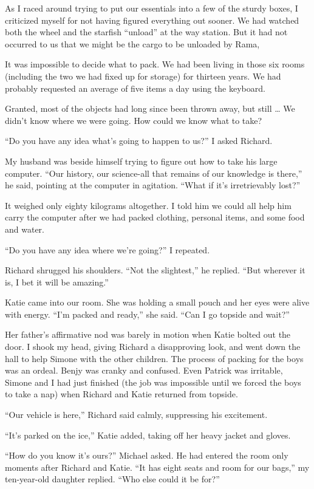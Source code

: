 \documentclass[]{article}
\begin{document}
{As I raced around trying to put our essentials into a few of the sturdy boxes, I criticized myself for not having figured everything out sooner.  We had watched both the wheel and the starfish “unload” at the way station.  But it had not occurred to us that we might be the cargo to be unloaded by Rama,

It was impossible to decide what to pack.  We had been living in those six rooms (including the two we had fixed up for storage) for thirteen years.  We had probably requested an average of five items a day using the keyboard.

Granted, most of the objects had long since been thrown away, but still … We didn’t know where we were going.  How could we know what to take?

“Do you have any idea what’s going to happen to us?” I asked Richard.

My husband was beside himself trying to figure out how to take his large computer.  “Our history, our science-all that remains of our knowledge is there,” he said, pointing at the computer in agitation.  “What if it’s irretrievably lost?”

It weighed only eighty kilograms altogether.  I told him we could all help him carry the computer after we had packed clothing, personal items, and some food and water.

“Do you have any idea where we’re going?” I repeated.

Richard shrugged his shoulders.  “Not the slightest,” he replied.  “But wherever it is, I bet it will be amazing.”

Katie came into our room.  She was holding a small pouch and her eyes were alive with energy.  “I’m packed and ready,” she said.  “Can I go topside and wait?”

Her father’s affirmative nod was barely in motion when Katie bolted out the door.  I shook my head, giving Richard a disapproving look, and went down the hall to help Simone with the other children.  The process of packing for the boys was an ordeal.  Benjy was cranky and confused.  Even Patrick was irritable, Simone and I had just finished (the job was impossible until we forced the boys to take a nap) when Richard and Katie returned from topside.

“Our vehicle is here,” Richard said calmly, suppressing his excitement.

“It’s parked on the ice,” Katie added, taking off her heavy jacket and gloves.

“How do you know it’s ours?” Michael asked.  He had entered the room only moments after Richard and Katie.  “It has eight seats and room for our bags,” my ten-year-old daughter replied.  “Who else could it be for?”

}
\end{document}
